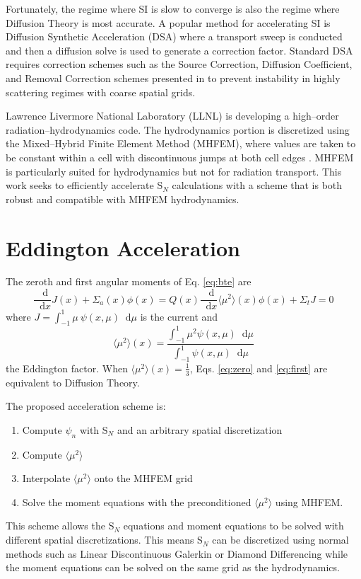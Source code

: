 \documentclass{anstrans}
\newcommand{\SN}{S$_N$\xspace}
\newcommand{\ud}{\mathop{}\!\mathrm{d}} %
\newcommand{\dderiv}[2]{\frac{\ud #1}{\ud #2}}
\newcommand{\edd}{\langle \mu^2 \rangle}
\begin{document}
	Fortunately, the regime where SI is slow to converge is also the regime where Diffusion Theory is most accurate. A popular method for accelerating SI is Diffusion Synthetic Acceleration (DSA) where a transport sweep is conducted and then a diffusion solve is used to generate a correction factor. Standard DSA requires correction schemes such as the Source Correction, Diffusion Coefficient, and Removal Correction schemes presented in \cite{alcouffe} to prevent instability in highly scattering regimes with coarse spatial grids. 

	Lawrence Livermore National Laboratory (LLNL) is developing a high--order radiation--hydrodynamics code. The hydrodynamics portion is discretized using the Mixed--Hybrid Finite Element Method (MHFEM), where values are taken to be constant within a cell with discontinuous jumps at both cell edges \cite{mhfem}. MHFEM is particularly suited for hydrodynamics but not for radiation transport. This work seeks to efficiently accelerate \SN calculations with a scheme that is both robust and compatible with MHFEM hydrodynamics. 

\section{Eddington Acceleration}
	The zeroth and first angular moments of Eq. \ref{eq:bte} are 
		\begin{subequations} 
		\begin{equation} \label{eq:zero}
			\dderiv{}{x} J(x) + \Sigma_a(x) \phi(x) = Q(x) 
		\end{equation} 
		\begin{equation} \label{eq:first}
			\frac{\ud}{\ud x} \edd(x) \phi(x) + \Sigma_t J = 0  
		\end{equation}
		\end{subequations}
	where $J = \int_{-1}^{1} \mu \ \psi(x, \mu) \ud \mu$ is the current and 
		\begin{equation} \label{eq:eddington} 
			\edd(x) = \frac{\int_{-1}^1 \mu^2 \psi(x, \mu) \ud \mu}{\int_{-1}^1 \psi(x, \mu) \ud \mu}
		\end{equation}
	the Eddington factor. When $\edd(x) = \frac{1}{3}$, Eqs. \ref{eq:zero} and \ref{eq:first} are equivalent to Diffusion Theory. 

	The proposed acceleration scheme is: 
		\begin{enumerate}
			\item Compute $\psi_n$ with \SN and an arbitrary spatial discretization
			\item Compute $\edd$ 
			\item Interpolate $\edd$ onto the MHFEM grid 
			\item Solve the moment equations with the preconditioned $\edd$ using MHFEM. 
		\end{enumerate}
	This scheme allows the \SN equations and moment equations to be solved with different spatial discretizations. This means \SN can be discretized using normal methods such as Linear Discontinuous Galerkin or Diamond Differencing while the moment equations can be solved on the same grid as the hydrodynamics. 
\end{document}
